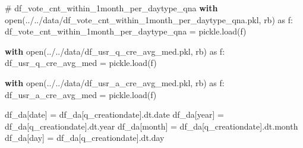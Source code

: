 \documentclass[
  letterpaper,
  DIV=11,
  numbers=noendperiod]{scrartcl}
\newenvironment{Shaded}{\begin{snugshade}}{\end{snugshade}}
\newcommand{\BuiltInTok}[1]{\textcolor[rgb]{0.00,0.23,0.31}{#1}}
\newcommand{\CommentTok}[1]{\textcolor[rgb]{0.37,0.37,0.37}{#1}}
\newcommand{\ControlFlowTok}[1]{\textcolor[rgb]{0.00,0.23,0.31}{\textbf{#1}}}
\newcommand{\ImportTok}[1]{\textcolor[rgb]{0.00,0.46,0.62}{#1}}
\newcommand{\NormalTok}[1]{\textcolor[rgb]{0.00,0.23,0.31}{#1}}
\newcommand{\OperatorTok}[1]{\textcolor[rgb]{0.37,0.37,0.37}{#1}}
\newcommand{\StringTok}[1]{\textcolor[rgb]{0.13,0.47,0.30}{#1}}
\begin{document}
\begin{Shaded}
\begin{Highlighting}[]
\CommentTok{\# df\_vote\_cnt\_within\_1month\_per\_daytype\_qna}
\ControlFlowTok{with} \BuiltInTok{open}\NormalTok{(}\StringTok{\textquotesingle{}../../data/df\_vote\_cnt\_within\_1month\_per\_daytype\_qna.pkl\textquotesingle{}}\NormalTok{, }\StringTok{\textquotesingle{}rb\textquotesingle{}}\NormalTok{) }\ImportTok{as}\NormalTok{ f:}
\NormalTok{    df\_vote\_cnt\_within\_1month\_per\_daytype\_qna }\OperatorTok{=}\NormalTok{ pickle.load(f)}
\end{Highlighting}
\end{Shaded}

\begin{Shaded}
\begin{Highlighting}[]
\ControlFlowTok{with} \BuiltInTok{open}\NormalTok{(}\StringTok{\textquotesingle{}../../data/df\_usr\_q\_cre\_avg\_med.pkl\textquotesingle{}}\NormalTok{, }\StringTok{\textquotesingle{}rb\textquotesingle{}}\NormalTok{) }\ImportTok{as}\NormalTok{ f:}
\NormalTok{    df\_usr\_q\_cre\_avg\_med }\OperatorTok{=}\NormalTok{ pickle.load(f)}
\end{Highlighting}
\end{Shaded}

\begin{Shaded}
\begin{Highlighting}[]
\ControlFlowTok{with} \BuiltInTok{open}\NormalTok{(}\StringTok{\textquotesingle{}../../data/df\_usr\_a\_cre\_avg\_med.pkl\textquotesingle{}}\NormalTok{, }\StringTok{\textquotesingle{}rb\textquotesingle{}}\NormalTok{) }\ImportTok{as}\NormalTok{ f:}
\NormalTok{    df\_usr\_a\_cre\_avg\_med }\OperatorTok{=}\NormalTok{ pickle.load(f)}
\end{Highlighting}
\end{Shaded}

\begin{Shaded}
\begin{Highlighting}[]
\NormalTok{df\_da[}\StringTok{\textquotesingle{}date\textquotesingle{}}\NormalTok{]   }\OperatorTok{=}\NormalTok{ df\_da[}\StringTok{\textquotesingle{}q\_creationdate\textquotesingle{}}\NormalTok{].dt.date}
\NormalTok{df\_da[}\StringTok{\textquotesingle{}year\textquotesingle{}}\NormalTok{]   }\OperatorTok{=}\NormalTok{ df\_da[}\StringTok{\textquotesingle{}q\_creationdate\textquotesingle{}}\NormalTok{].dt.year}
\NormalTok{df\_da[}\StringTok{\textquotesingle{}month\textquotesingle{}}\NormalTok{]  }\OperatorTok{=}\NormalTok{ df\_da[}\StringTok{\textquotesingle{}q\_creationdate\textquotesingle{}}\NormalTok{].dt.month}
\NormalTok{df\_da[}\StringTok{\textquotesingle{}day\textquotesingle{}}\NormalTok{]    }\OperatorTok{=}\NormalTok{ df\_da[}\StringTok{\textquotesingle{}q\_creationdate\textquotesingle{}}\NormalTok{].dt.day}
\end{Highlighting}
\end{Shaded}
\end{document}
